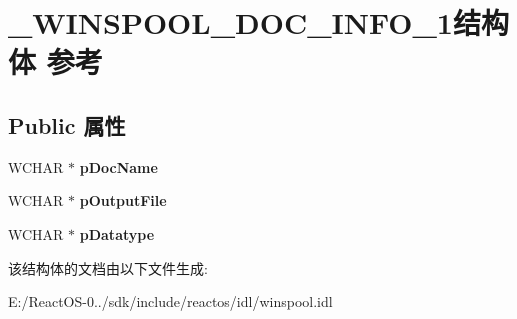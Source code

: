 \hypertarget{struct___w_i_n_s_p_o_o_l___d_o_c___i_n_f_o__1}{}\section{\+\_\+\+W\+I\+N\+S\+P\+O\+O\+L\+\_\+\+D\+O\+C\+\_\+\+I\+N\+F\+O\+\_\+1结构体 参考}
\label{struct___w_i_n_s_p_o_o_l___d_o_c___i_n_f_o__1}
\subsection*{Public 属性}
\begin{DoxyCompactItemize}
\item 
\mbox{\label{struct___w_i_n_s_p_o_o_l___d_o_c___i_n_f_o__1_add5046abd27aac3ac8e013ac9b826b52}} 
W\+C\+H\+AR $\ast$ {\bfseries p\+Doc\+Name}
\item 
\mbox{\label{struct___w_i_n_s_p_o_o_l___d_o_c___i_n_f_o__1_a7ec183bcb8ccc2c991853156e06f74ed}} 
W\+C\+H\+AR $\ast$ {\bfseries p\+Output\+File}
\item 
\mbox{\label{struct___w_i_n_s_p_o_o_l___d_o_c___i_n_f_o__1_ae6fab752ea7de6f95a53a954584bb2ef}} 
W\+C\+H\+AR $\ast$ {\bfseries p\+Datatype}
\end{DoxyCompactItemize}


该结构体的文档由以下文件生成\+:\begin{DoxyCompactItemize}
\item 
E\+:/\+React\+O\+S-\/0../sdk/include/reactos/idl/winspool.\+idl\end{DoxyCompactItemize}
